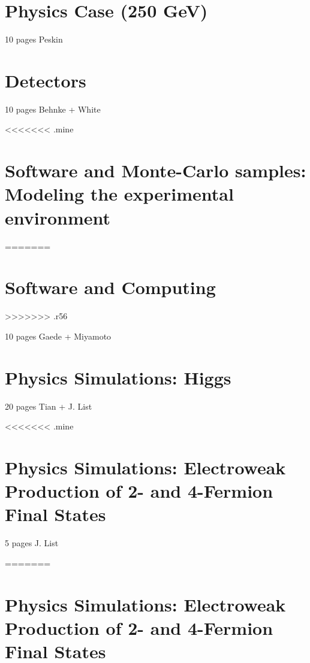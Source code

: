 \documentclass[%
 reprint,
 amsmath,amssymb,
 aps,
]{revtex4-1}
\begin{document}

   
   
\section{\label{sec:physics}Physics Case (250 GeV) }

10 pages Peskin
 

 
\section{\label{sec:detectors}Detectors }


  10 pages Behnke + White
  


<<<<<<< .mine
\section{\label{sec:software}Software and Monte-Carlo samples: Modeling the experimental environment}
=======
\section{\label{sec:software}Software and Computing}
>>>>>>> .r56

   10 pages Gaede + Miyamoto
   
   

\section{\label{sec:higgs}Physics Simulations: Higgs
}


  20 pages Tian + J. List
  
  

<<<<<<< .mine
\section{\label{sec:ew}Physics Simulations: Electroweak Production of 2- and 4-Fermion Final States }


  5 pages J. List
  



=======
\section{\label{sec:ew}Physics Simulations: Electroweak Production of 2- and 4-Fermion Final States }
\end{document}
